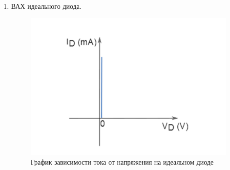 \documentclass[a4paper,14pt]{article}
\begin{document}
\begin{enumerate}
	
	\item ВАХ идеального диода.
	
	\begin{figure}[H]
		\centering
		\includegraphics[width=0.5\linewidth]{image/intro_001}
		\caption{График зависимости тока от напряжения на идеальном диоде}
	\end{figure}
\end{enumerate}
\end{document}
